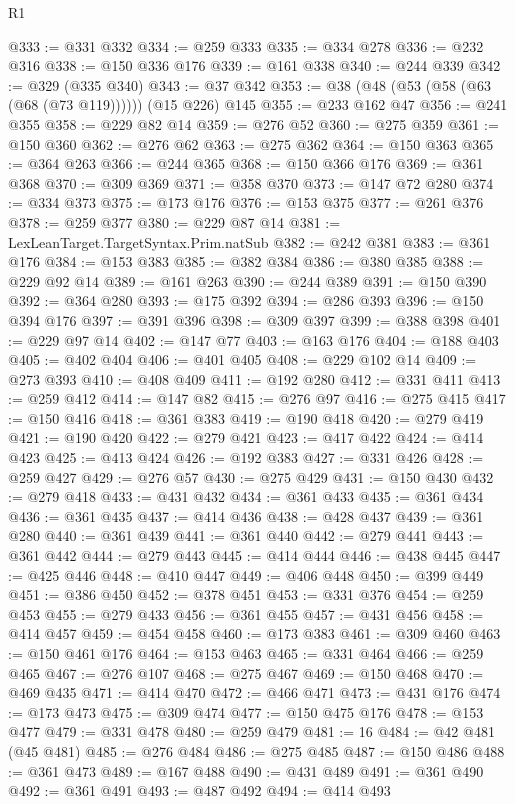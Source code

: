 \begin{lexlean}{R1}
\begin{coremodule}
@333 := @331 @332
@334 := @259 @333
@335 := @334 @278
@336 := @232 @316
@338 := @150 @336 @176
@339 := @161 @338
@340 := @244 @339
@342 := @329 (@335 @340)
@343 := @37 @342
@353 := @38 (@48 (@53 (@58 (@63 (@68 (@73 @119)))))) (@15 @226) @145
@355 := @233 @162 @47
@356 := @241 @355
@358 := @229 @82 @14
@359 := @276 @52
@360 := @275 @359
@361 := @150 @360
@362 := @276 @62
@363 := @275 @362
@364 := @150 @363
@365 := @364 @263
@366 := @244 @365
@368 := @150 @366 @176
@369 := @361 @368
@370 := @309 @369
@371 := @358 @370
@373 := @147 @72 @280
@374 := @334 @373
@375 := @173 @176
@376 := @153 @375
@377 := @261 @376
@378 := @259 @377
@380 := @229 @87 @14
@381 := LexLeanTarget.TargetSyntax.Prim.natSub
@382 := @242 @381
@383 := @361 @176
@384 := @153 @383
@385 := @382 @384
@386 := @380 @385
@388 := @229 @92 @14
@389 := @161 @263
@390 := @244 @389
@391 := @150 @390
@392 := @364 @280
@393 := @175 @392
@394 := @286 @393
@396 := @150 @394 @176
@397 := @391 @396
@398 := @309 @397
@399 := @388 @398
@401 := @229 @97 @14
@402 := @147 @77
@403 := @163 @176
@404 := @188 @403
@405 := @402 @404
@406 := @401 @405
@408 := @229 @102 @14
@409 := @273 @393
@410 := @408 @409
@411 := @192 @280
@412 := @331 @411
@413 := @259 @412
@414 := @147 @82
@415 := @276 @97
@416 := @275 @415
@417 := @150 @416
@418 := @361 @383
@419 := @190 @418
@420 := @279 @419
@421 := @190 @420
@422 := @279 @421
@423 := @417 @422
@424 := @414 @423
@425 := @413 @424
@426 := @192 @383
@427 := @331 @426
@428 := @259 @427
@429 := @276 @57
@430 := @275 @429
@431 := @150 @430
@432 := @279 @418
@433 := @431 @432
@434 := @361 @433
@435 := @361 @434
@436 := @361 @435
@437 := @414 @436
@438 := @428 @437
@439 := @361 @280
@440 := @361 @439
@441 := @361 @440
@442 := @279 @441
@443 := @361 @442
@444 := @279 @443
@445 := @414 @444
@446 := @438 @445
@447 := @425 @446
@448 := @410 @447
@449 := @406 @448
@450 := @399 @449
@451 := @386 @450
@452 := @378 @451
@453 := @331 @376
@454 := @259 @453
@455 := @279 @433
@456 := @361 @455
@457 := @431 @456
@458 := @414 @457
@459 := @454 @458
@460 := @173 @383
@461 := @309 @460
@463 := @150 @461 @176
@464 := @153 @463
@465 := @331 @464
@466 := @259 @465
@467 := @276 @107
@468 := @275 @467
@469 := @150 @468
@470 := @469 @435
@471 := @414 @470
@472 := @466 @471
@473 := @431 @176
@474 := @173 @473
@475 := @309 @474
@477 := @150 @475 @176
@478 := @153 @477
@479 := @331 @478
@480 := @259 @479
@481 := 16
@484 := @42 @481 (@45 @481)
@485 := @276 @484
@486 := @275 @485
@487 := @150 @486
@488 := @361 @473
@489 := @167 @488
@490 := @431 @489
@491 := @361 @490
@492 := @361 @491
@493 := @487 @492
@494 := @414 @493

\end{coremodule}
\end{lexlean}
